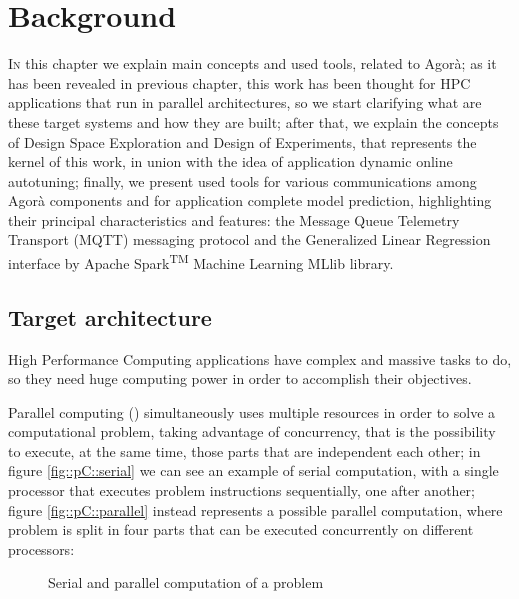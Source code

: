 \chapter{Background}\label{back}

\lettrine{I}{n} this chapter we explain main concepts and used tools, related to Agorà; as it has been revealed in previous chapter, this work has been thought for HPC applications that run in parallel architectures, so we start clarifying what are these target systems and how they are built; after that, we explain the concepts of Design Space Exploration and Design of Experiments, that represents the kernel of this work, in union with the idea of application dynamic online autotuning; finally, we present used tools for various communications among Agorà components and for application complete model prediction, highlighting their principal characteristics and features: the Message Queue Telemetry Transport (MQTT) messaging protocol and the Generalized Linear Regression interface by Apache Spark\textsuperscript{TM} Machine Learning MLlib library.

\section{Target architecture}

High Performance Computing applications have complex and massive tasks to do, so they need huge computing power in order to accomplish their objectives.

Parallel computing (\cite{barney2012introduction}) simultaneously uses multiple re\-sourc\-es in order to solve a computational problem, taking advantage of concurrency, that is the possibility to execute, at the same time, those parts that are independent each other; in figure \ref{fig::pC::serial} we can see an example of serial computation, with a single processor that executes problem instructions sequentially, one after another; figure \ref{fig::pC::parallel} instead represents a possible parallel computation, where problem is split in four parts that can be executed concurrently on different processors:

\begin{figure}[H]

    \centering

    \enskip
    
    \caption{Serial and parallel computation of a problem}

\end{figure}

